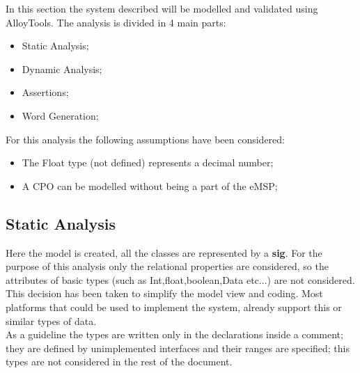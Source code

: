 In this section the system described will be modelled and validated using AlloyTools. The analysis is divided in 4 main parts:
\begin{itemize}
    \item Static Analysis;
    \item Dynamic Analysis;
    \item Assertions;
    \item Word Generation;
\end{itemize}
For this analysis the following assumptions have been considered:
\begin{itemize}
    \item The Float type (not defined) represents a decimal number;
    \item A \ac{CPO} can be modelled without being a part of the \ac{eMSP};
\end{itemize}

\subsection{Static Analysis}
Here the model is created, all the classes are represented by a \textbf{sig}. For the purpose of this analysis only the relational properties are considered, so the attributes of basic types (such as Int,float,boolean,Data etc...) are not considered.
This decision has been taken to simplify the model view and coding. Most platforms that could be used to implement the system, already support this or similar types of data.\\
As a guideline the types are written only in the declarations inside a comment; they are defined by unimplemented interfaces and their ranges are specified; this types are not considered in the rest of the document.

